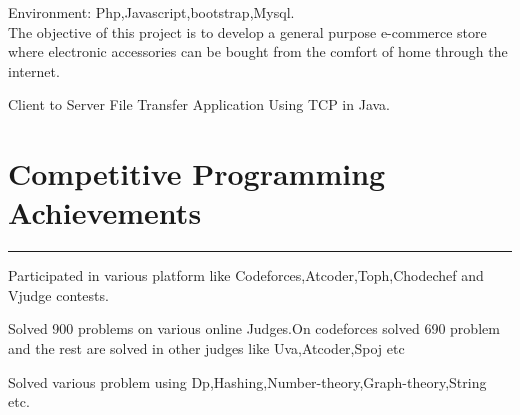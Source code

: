 \documentclass[]{rahulworld-resume}
\begin{document}
\begin{minipage}[t]{0.66\textwidth}
 
\noindent
\hspace{5em}%
\begin{minipage}{0.85\textwidth\vspace{5pt}}
Environment: Php,Javascript,bootstrap,Mysql.\\
The objective of this project is to develop a general purpose e-commerce store where electronic accessories   can be bought from the comfort of home through the internet. 
\end{minipage}





 
\noindent
\hspace{5em}%
\begin{minipage}{0.85\textwidth\vspace{5pt}}
Client to Server File Transfer Application
Using TCP in Java.
\end{minipage}







\section{Competitive Programming Achievements} 

\noindent\rule{12.5cm}{0.4pt}
 
\noindent
\hspace{5em}%
\begin{minipage}{0.85\textwidth\vspace{5pt}}
Participated in various platform like Codeforces,Atcoder,Toph,Chodechef and Vjudge contests.
\end{minipage}




 
\noindent
\hspace{5em}%
\begin{minipage}{0.85\textwidth\vspace{5pt}}
Solved 900 problems on various online Judges.On codeforces solved 690 problem and the rest are solved in other judges like Uva,Atcoder,Spoj etc
\end{minipage}



 
 


 
\noindent
\hspace{5em}%
\begin{minipage}{0.85\textwidth\vspace{5pt}}
Solved various problem using Dp,Hashing,Number-theory,Graph-theory,String etc.
\end{minipage}


\end{minipage} 
\end{document}
